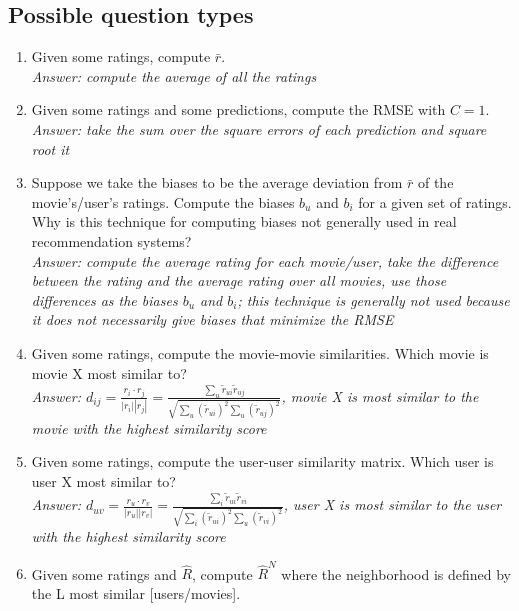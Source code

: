 \documentclass{article}
\newcommand{\MatrixVariable}[1]{\bm{\mathit{#1}}}
\begin{document}
\subsection{Possible question types}

\begin{enumerate}
\item Given some ratings, compute $\bar{r}$. \\
\textit{Answer: compute the average of all the ratings}
\item Given some ratings and some predictions, compute the RMSE with $C = 1$. \\
\textit{Answer: take the sum over the square errors of each prediction and square root it}
\item Suppose we take the biases to be the average deviation from $\bar{r}$ of the movie's/user's ratings. Compute the biases $b_u$ and $b_i$ for a given set of ratings. Why is this technique for computing biases not generally used in real recommendation systems? \\
\textit{Answer: compute the average rating for each movie/user, take the difference between the rating and the average rating over all movies, use those differences as the biases $b_u$ and $b_i$; this technique is generally not used because it does not necessarily give biases that minimize the RMSE}
\item Given some ratings, compute the movie-movie similarities. Which movie is movie X most similar to? \\
\textit{Answer: $d_{ij} = \frac{\MatrixVariable{r}_i \cdot \MatrixVariable{r}_j}{|\MatrixVariable{r}_i||\MatrixVariable{r}_j|} = \frac{\sum_u \tilde{r}_{ui} \tilde{r}_{uj}}{\sqrt{\sum_u (\tilde{r}_{ui})^2 \sum_u (\tilde{r}_{uj})^2}}$, movie X is most similar to the movie with the highest similarity score}
\item Given some ratings, compute the user-user similarity matrix. Which user is user X most similar to? \\
\textit{Answer: $d_{uv} = \frac{\MatrixVariable{r}_u \cdot \MatrixVariable{r}_v}{|\MatrixVariable{r}_u||\MatrixVariable{r}_v|} = \frac{\sum_i \tilde{r}_{ui} \tilde{r}_{vi}}{\sqrt{\sum_i (\tilde{r}_{ui})^2 \sum_u (\tilde{r}_{vi})^2}}$, user X is most similar to the user with the highest similarity score}
\item Given some ratings and $\hat{\MatrixVariable{R}}$, compute $\hat{\MatrixVariable{R}}^N$ where the neighborhood is defined by the L most similar [users/movies]. \\

\end{enumerate}
\end{document}
